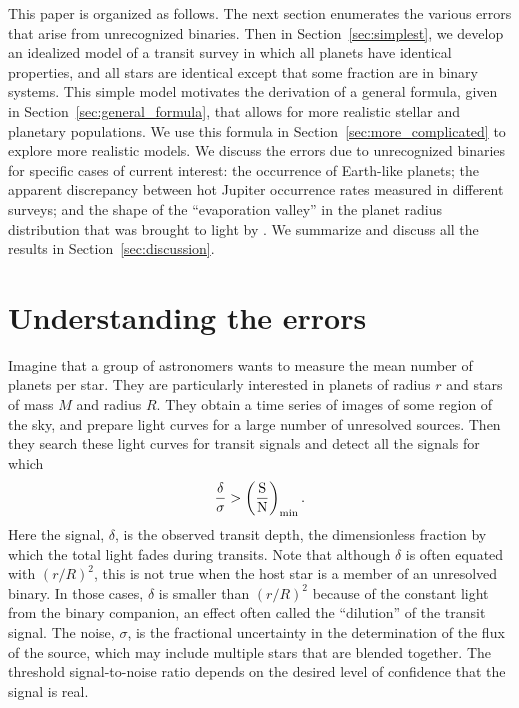 \documentclass[12pt,modern,trackchanges]{aastex61}
\begin{document}
This paper is organized as follows.  The next section enumerates the
various errors that arise from unrecognized binaries.  Then in
Section~\ref{sec:simplest}, we develop an idealized model of a transit
survey in which all planets have identical properties, and all stars
are identical except that some fraction are in binary systems.  This
simple model motivates the derivation of a general formula, given in
Section~\ref{sec:general_formula}, that allows for more realistic
stellar and planetary populations.  We use this formula in
Section~\ref{sec:more_complicated} to explore more realistic models.
We discuss the errors due to unrecognized binaries for specific cases
of current interest: the occurrence of Earth-like planets; the
apparent discrepancy between hot Jupiter occurrence rates measured in
different surveys; and the shape of the ``evaporation valley'' in the
planet radius distribution that was brought to light by
\citet{fulton_california-_2017}.  We summarize and discuss all the
results in Section~\ref{sec:discussion}.


\section{Understanding the errors}
\label{sec:concept}

Imagine that a group of astronomers wants to measure the mean number
of planets per star.  They are particularly interested in planets of
radius $r$ and stars of mass $M$ and radius $R$.  They obtain a time
series of images of some region of the sky, and prepare light curves
for a large number of unresolved sources.  Then they search these
light curves for transit signals and detect all the signals for which
\begin{equation}
  \frac{\delta}{\sigma}
  >
  \left(\frac{{\rm S}}{{\rm N}}\right)_{\rm min}.
\label{eq:S_N_thresh}
\end{equation}
Here the signal, $\delta$, is the observed transit depth, the
dimensionless fraction by which the total light fades during transits.
Note that although $\delta$ is often equated with $(r/R)^2$, this is
not true when the host star is a member of an unresolved binary.  In
those cases, $\delta$ is smaller than $(r/R)^2$ because of the
constant light from the binary companion, an effect often called the
``dilution'' of the transit signal.  The noise, $\sigma$, is the
fractional uncertainty in the determination of the flux of the source,
which may include multiple stars that are blended together.  The
threshold signal-to-noise ratio depends on the desired level of
confidence that the signal is real.
\end{document}
